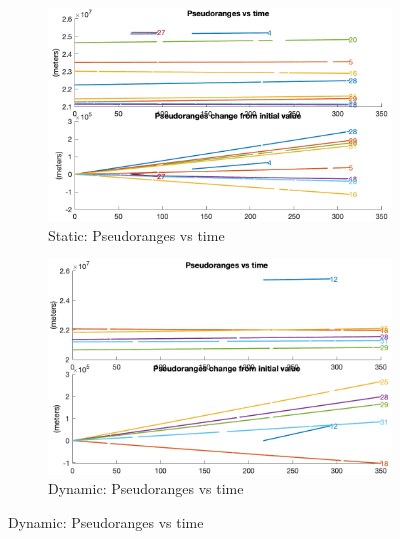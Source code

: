         \begin{figure}[h!]
            \centering
            \begin{subfigure}{0.23\textwidth}
                \includegraphics[width=\textwidth]{images/tests/Monte_Cappuccini/png/Samsung_A51_Monte_Cappuccini_fig1.png}
                \caption{Static: Pseudoranges vs time}
            \end{subfigure}
            \hfill
            \begin{subfigure}{0.23\textwidth}
                \includegraphics[width=\textwidth]{images/tests/Tram_15_trip_Castello_to_Pescatore/filtered/Samsung_A51_Tram_15_trip_Castello_to_Pescatore_fig1.png}
                \caption{Dynamic: Pseudoranges vs time}
            \end{subfigure}
        \end{figure}
    

